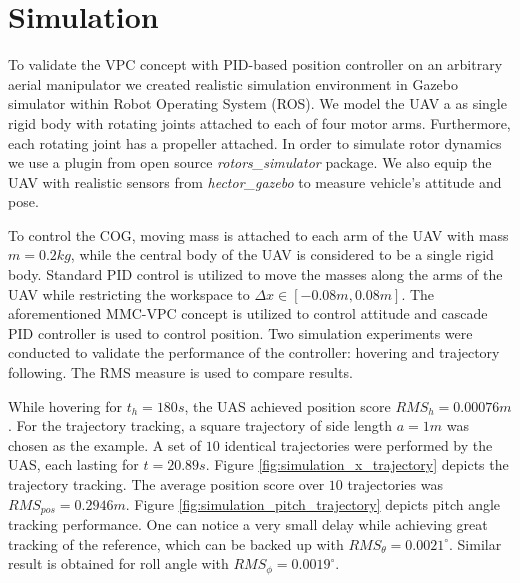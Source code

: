 \section{Simulation}
\label{sec:simulation}
To validate the VPC concept with PID-based position controller on an arbitrary aerial manipulator we created realistic simulation environment in Gazebo simulator within Robot Operating System (ROS). We model the UAV a as single rigid body with rotating joints attached to each of four motor arms. Furthermore, each rotating joint has a propeller attached. In order to simulate rotor dynamics we use a plugin from open source \textit{rotors\_simulator} \cite{Furrer2016} package. We also equip the UAV with realistic sensors from \textit{hector\_gazebo} \cite{2012simpar_meyer} to measure vehicle's attitude and pose.

To control the COG, moving mass is attached to each arm of the UAV with mass $m=0.2kg$, while the central body of the UAV is considered to be a single rigid body. Standard PID control is utilized to move the masses along the arms of the UAV while restricting the workspace to $\Delta x \in [-0.08m, 0.08m]$. The aforementioned MMC-VPC concept is utilized to control attitude and cascade PID controller is used to control position. Two simulation experiments were conducted to validate the performance of the controller: hovering and trajectory following. The RMS measure is used to compare results.

While hovering for $t_h = 180s$, the UAS achieved position score $RMS_h = 0.00076m$. For the trajectory tracking, a square trajectory of side length $a=1m$ was chosen as the example. A set of $10$ identical trajectories were performed by the UAS, each lasting for $t=20.89s$. Figure \ref{fig:simulation_x_trajectory} depicts the trajectory tracking. The average position score over $10$ trajectories was $RMS_{pos} = 0.2946m$. Figure \ref{fig:simulation_pitch_trajectory} depicts pitch angle tracking performance. One can notice a very small delay while achieving great tracking of the reference, which can be backed up with $RMS_{\theta} = 0.0021^\circ$. Similar result is obtained for roll angle with $RMS_{\phi} = 0.0019^\circ$.  

\begin{figure}[h!]
  \centering
  \hfill
  \caption{}
  \label{fig:simulation_results}
\end{figure}